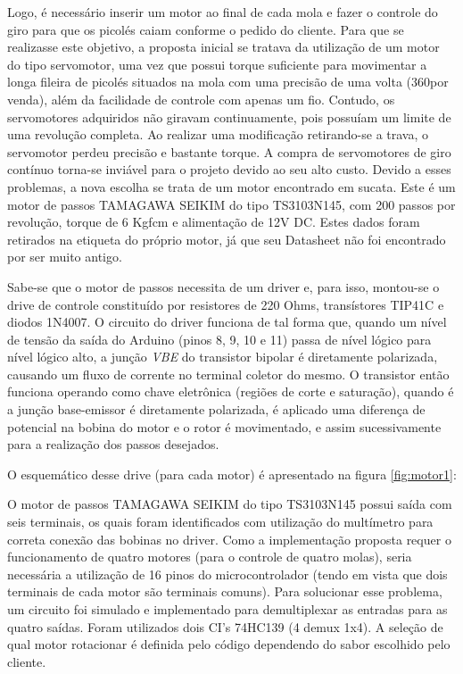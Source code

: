 Logo, é necessário inserir um motor ao final de cada mola e fazer o controle do giro para que os picolés caiam conforme o pedido do cliente. Para que se realizasse este objetivo, a proposta inicial se tratava da utilização de um motor do tipo servomotor, uma vez que possui torque suficiente para movimentar a longa fileira de picolés situados na mola com uma precisão de uma volta (360\degree por venda), além da facilidade de controle com apenas um fio. Contudo, os servomotores adquiridos não giravam continuamente, pois possuíam um limite de uma revolução completa. Ao realizar uma modificação retirando-se a trava, o servomotor perdeu precisão e bastante torque. A compra de servomotores de giro contínuo torna-se inviável para o projeto devido ao seu alto custo. Devido a esses problemas, a nova escolha se trata de um motor encontrado em sucata. Este é um motor de passos TAMAGAWA SEIKIM do tipo TS3103N145, com 200 passos por revolução, torque de 6 Kgfcm e alimentação de 12V DC. Estes dados foram retirados na etiqueta do próprio motor, já que seu Datasheet não foi encontrado por ser muito antigo.

Sabe-se que o motor de passos necessita de um driver e, para isso, montou-se o drive de controle constituído por resistores de 220 Ohms, transístores TIP41C e diodos 1N4007. O circuito do driver funciona de tal forma que, quando um nível de tensão da saída do Arduino (pinos 8, 9, 10 e 11) passa de nível lógico para nível lógico alto, a junção \textit{VBE} do transistor bipolar é diretamente polarizada, causando um fluxo de corrente no terminal coletor do mesmo. O transistor então funciona operando como chave eletrônica (regiões de corte e saturação), quando é a junção base-emissor é diretamente polarizada, é aplicado uma diferença de potencial na bobina do motor e o rotor é movimentado, e assim sucessivamente para a realização dos passos desejados.

O esquemático desse drive (para cada motor) é apresentado na figura \ref{fig:motor1}:


O motor de passos TAMAGAWA SEIKIM do tipo TS3103N145 possui saída com seis terminais, os quais foram identificados com utilização do multímetro para correta conexão das bobinas no driver. Como a implementação proposta requer o funcionamento de quatro motores (para o controle de quatro molas), seria necessária a utilização de 16 pinos do microcontrolador (tendo em vista que dois terminais de cada motor são terminais comuns). Para solucionar esse problema, um circuito foi simulado e implementado para demultiplexar as entradas para as quatro saídas. Foram utilizados dois CI's 74HC139 (4 demux 1x4). A seleção de qual motor rotacionar é definida pelo código dependendo do sabor escolhido pelo cliente. 

